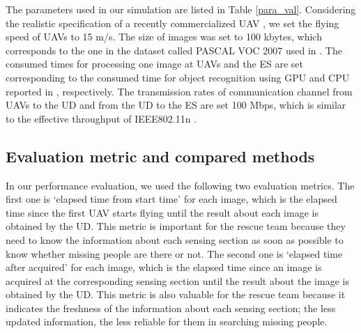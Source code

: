\documentclass[journal]{IEEEtran}
\begin{document}
The parameters used in our simulation are listed in Table \ref{para_val}.
%
Considering the realistic specification of a recently commercialized UAV \cite{bebop2}, we set the flying speed of UAVs to 15 m/s.
%
The size of images was set to 100 kbytes, which corresponds to the one in the dataset called PASCAL VOC 2007 used in \cite{Ren2015}.
%
The consumed times for processing one image at UAVs and the ES are set corresponding to the consumed time for object recognition using GPU and CPU reported in \cite{Ren2015}, respectively.
%
The transmission rates of communication channel from UAVs to the UD and from the UD to the ES are set 100 Mbps, which is similar to the effective throughput of IEEE802.11n \cite{Li2013}.

\subsection{Evaluation metric and compared methods}\label{compare}
In our performance evaluation, we used the following two evaluation metrics.
%
The first one is `elapsed time from start time' for each image, which is the elapsed time since the first UAV starts flying until the result about each image is obtained by the UD.
%
This metric is important for the rescue team because they need to know the information about each sensing section as soon as possible to know whether missing people are there or not.
%
The second one is `elapsed time after acquired' for each image, which is the elapsed time since an image is acquired at the corresponding sensing section until the result about the image is obtained by the UD.
%
This metric is also valuable for the rescue team because it indicates the freshness of the information about each sensing section; the less updated information, the less reliable for them in searching missing people.
\end{document}
